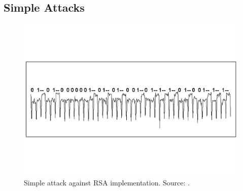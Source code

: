 \subsection{Simple Attacks}\label{sec:simple}
\begin{figure}
\centering
\includegraphics[width=\textwidth]{../Figures/SPA_SM_kocher_2011.pdf} 
\caption{Simple attack against RSA implementation. Source: \cite{kocher2011introduction}.}\label{fig:SPA}
\end{figure}

